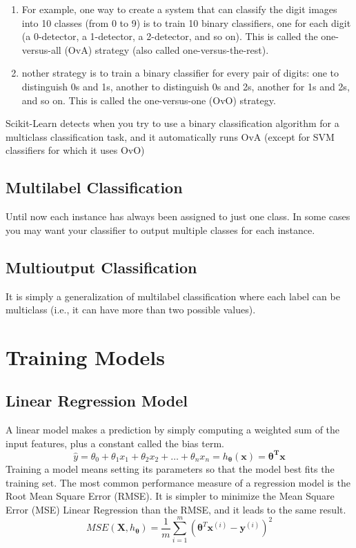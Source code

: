 \documentclass[french]{article}
\begin{document}
\begin{enumerate}
    \item For example, one way to create a system that can classify the digit images into 10 classes (from 0 to 9) is to train 10 binary classifiers, one for each digit (a 0-detector, a 1-detector, a 2-detector, and so on). This is called the one-versus-all (OvA) strategy (also called one-versus-the-rest).
    \item nother strategy is to train a binary classifier for every pair of digits: one to distinguish 0s and 1s, another to distinguish 0s and 2s, another for 1s and 2s, and so on. This is called the one-versus-one (OvO) strategy.
\end{enumerate}

Scikit-Learn detects when you try to use a binary classification algorithm for a multiclass classification task, and it automatically runs OvA (except for SVM classifiers for which it uses OvO)

\subsection{Multilabel Classification}

Until now each instance has always been assigned to just one class. In some cases you may want your classifier to output multiple classes for each instance.

\subsection{Multioutput Classification}

It is simply a generalization of multilabel classification where each label can be multiclass (i.e., it can have more than two possible values).

\section{Training Models}

\subsection{Linear Regression Model}

A linear model makes a prediction by simply computing a weighted sum of the input features, plus a constant called the bias term.
\[\hat y = \theta_0 + \theta_1 x_1 + \theta_2 x_2 + \dots + \theta_n x_n = h_{\bm{\theta}}(\bm{x}) = \bm{\theta^T} \bm{x}\]
Training a model means setting its parameters so that the model best fits the training set. The most common performance measure of a regression model is the Root Mean Square Error (RMSE). It is simpler to minimize the Mean Square Error (MSE) Linear Regression than the RMSE, and it leads to the same result.
\[ MSE(\bm{X}, h_{\bm{\theta}}) = \frac{1}{m} \sum_{i=1}^m (\bm{\theta}^T\bm{x}^{(i)} - \bm{y}^{(i)}  )^2\]
\end{document}
